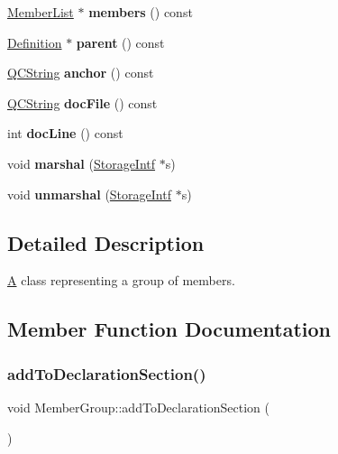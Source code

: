 \begin{DoxyCompactItemize}
\mbox{\hyperlink{class_member_list}{Member\+List}} $\ast$ {\bfseries members} () const
\item 
\mbox{\label{class_member_group_a34d104710672960231d7189ada1186a7}} 
\mbox{\hyperlink{class_definition}{Definition}} $\ast$ {\bfseries parent} () const
\item 
\mbox{\label{class_member_group_a1c79c6d7ff3161822eeaf430a7a1e590}} 
\mbox{\hyperlink{class_q_c_string}{Q\+C\+String}} {\bfseries anchor} () const
\item 
\mbox{\label{class_member_group_ac917d697ac387e35c72253fe6afec7b9}} 
\mbox{\hyperlink{class_q_c_string}{Q\+C\+String}} {\bfseries doc\+File} () const
\item 
\mbox{\label{class_member_group_acddbf4e98852c63461077bb29e80e00e}} 
int {\bfseries doc\+Line} () const
\item 
\mbox{\label{class_member_group_ab796087220398ed68fc951c86733cd5b}} 
void {\bfseries marshal} (\mbox{\hyperlink{class_storage_intf}{Storage\+Intf}} $\ast$s)
\item 
\mbox{\label{class_member_group_aef077d4cfe33a779afc771a184395724}} 
void {\bfseries unmarshal} (\mbox{\hyperlink{class_storage_intf}{Storage\+Intf}} $\ast$s)
\end{DoxyCompactItemize}


\subsection{Detailed Description}
\mbox{\hyperlink{class_a}{A}} class representing a group of members. 

\subsection{Member Function Documentation}
\mbox{\label{class_member_group_a1dc30e752b0c36ee2be1716ff8d83856}} 
\subsubsection{\texorpdfstring{addToDeclarationSection()}{addToDeclarationSection()}}
{\footnotesize\ttfamily void Member\+Group\+::add\+To\+Declaration\+Section (\begin{DoxyParamCaption}{ }\end{DoxyParamCaption})}

